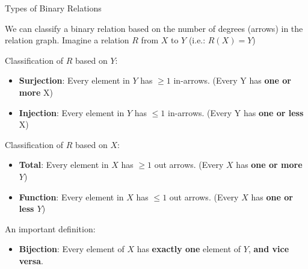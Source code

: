 \begin{frame}{Types of Binary Relations}

  We can classify a binary relation based on the number of degrees (arrows) in the relation graph. Imagine a relation $R$ from $X$ to $Y$ (i.e.: $R(X) = Y$)\bigskip

  Classification of $R$ based on $Y$:
  \begin{itemize}
  \item {\bf Surjection}: Every element in $Y$ has $\geq 1$ in-arrows. (Every Y has {\bf one or more} X)
  \item {\bf Injection}: Every element in $Y$ has $\leq 1$ in-arrows. (Every Y has {\bf one or less} X)
  \end{itemize}\smallskip

  Classification of $R$ based on $X$:
  \begin{itemize}
  \item {\bf Total}: Every element in $X$ has $\geq 1$ out arrows. (Every $X$ has {\bf one or more} $Y$)
  \item {\bf Function}: Every element in $X$ has $\leq 1$ out arrows. (Every $X$ has {\bf one or less $Y$})
  \end{itemize}\smallskip

  An important definition:
  \begin{itemize}
  \item {\bf Bijection}: Every element of $X$ has {\bf exactly one} element of $Y$, {\bf and vice versa}.
  \end{itemize}
\end{frame}

